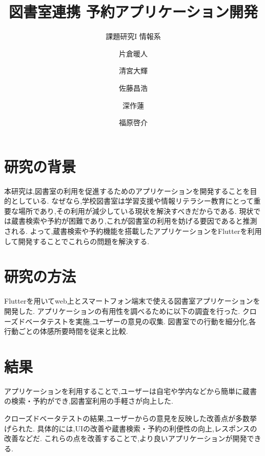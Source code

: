 \documentclass[twocolumn]{jsarticle}
\begin{document}
\title{図書室連携 予約アプリケーション開発}  
\author{課題研究I 情報系 \and 片倉暖人 \and 清宮大輝 \and 佐藤昌浩 \and 深作蓮 \and 福原啓介}
\date{\vspace{-10mm}}


\section{研究の背景}
本研究は,図書室の利用を促進するためのアプリケーションを開発することを目的としている.
なぜなら,学校図書室は学習支援や情報リテラシー教育にとって重要な場所であり,その利用が減少している現状を解決すべきだからである.
現状では蔵書検索や予約が困難であり,これが図書室の利用を妨げる要因であると推測される.
よって,蔵書検索や予約機能を搭載したアプリケーションをFlutterを利用して開発することでこれらの問題を解決する.
\section{研究の方法}
Flutterを用いてweb上とスマートフォン端末で使える図書室アプリケーションを開発した.
アプリケーションの有用性を調べるために以下の調査を行った.
クローズドベータテストを実施,ユーザーの意見の収集.
図書室での行動を細分化,各行動ごとの体感所要時間を従来と比較.
\section{結果}
アプリケーションを利用することで,ユーザーは自宅や学内などから簡単に蔵書の検索・予約ができ,図書室利用の手軽さが向上した.

クローズドベータテストの結果,ユーザーからの意見を反映した改善点が多数挙げられた.
具体的には,UIの改善や蔵書検索・予約の利便性の向上,レスポンスの改善などだ.
これらの点を改善することで,より良いアプリケーションが開発できる.
\end{document}
